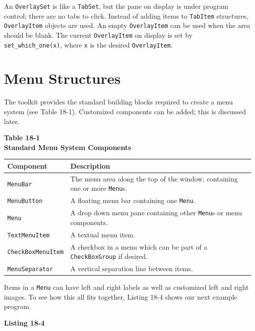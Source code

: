 An \texttt{OverlaySet} is like a \texttt{TabSet},
but the pane on display is under program control; there are no
tabs to click. Instead of adding items to \texttt{TabItem} structures,
\texttt{OverlayItem} objects are used. An empty \texttt{OverlayItem} can be
used when the area should be blank. The current \texttt{OverlayItem} on
display is set by \texttt{set\_which\_one(x)}, where \texttt{x} is
the desired \texttt{OverlayItem}.

\section{Menu Structures}

The toolkit provides the standard building blocks required to create
a menu system (see Table 18-1). Customized components can
be added; this is discussed later.

\begin{center}
{\centering\sffamily\bfseries
Table 18-1 \\
Standard Menu System Components}
\end{center}
\begin{flushleft}
\begin{xtabular}{|m{1.6in}|m{4.3in}|}
\hline
\sffamily\bfseries Component &
\sffamily\bfseries Description\\\hline
\texttt{MenuBar} &
The menu area along the top of the window, containing one or
more \texttt{Menu}s.\\\hline
\texttt{MenuButton} &
A floating menu bar containing one \texttt{Menu}.\\\hline
\texttt{Menu} &
A drop down menu pane containing other \texttt{Menu}s or menu
components.\\\hline
\texttt{TextMenuItem} &
A textual menu item.\\\hline
\ttfamily \texttt{CheckBoxMenuItem}  &
A checkbox in a menu which can be part of a \texttt{CheckBoxGroup} if
desired.\\\hline
\texttt{MenuSeparator} &
A vertical separation line between items.\\\hline
\end{xtabular}
\end{flushleft}
Items in a \texttt{Menu} can have left and right labels as well as
customized left and right images. To see how this all fits together,
Listing 18-4 shows our next example program.

\bigskip

{\sffamily\bfseries
Listing 18-4}

